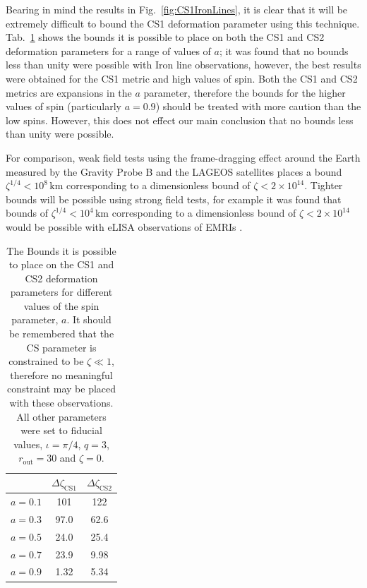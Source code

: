 Bearing in mind the results in Fig.\ \ref{fig:CS1IronLines}, it is clear that it will be extremely difficult to bound the CS1 deformation parameter using this technique. Tab.\ \ref{tab:CS1} shows the bounds it is possible to place on both the CS1 and CS2 deformation parameters for a range of values of $a$; it was found that no bounds less than unity were possible with Iron line observations, however, the best results were obtained for the CS1 metric and high values of spin. Both the CS1 and CS2 metrics are expansions in the $a$ parameter, therefore the bounds for the higher values of spin (particularly $a=0.9$) should be treated with more caution than the low spins. However, this does not effect our main conclusion that no bounds less than unity were possible. 

For comparison, weak field tests using the frame-dragging effect around the Earth measured by the Gravity Probe B and the LAGEOS satellites places a bound $\zeta^{1/4}<10^{8}\,\textrm{km}$ \citep{2011PhRvD..84l4033A} corresponding to a dimensionless bound of $\zeta < 2\times 10^{14}$. Tighter bounds will be possible using strong field tests, for example it was found that bounds of $\zeta^{1/4}<10^{4}\,\textrm{km}$ corresponding to a dimensionless bound of $\zeta < 2\times 10^{14}$ would be possible with eLISA observations of EMRIs \citep{2012PhRvD..86d4010C}.

\begin{table}[h]
\begin{center}
\begin{tabular}{ l | c  c }
	&$\Delta \zeta_{\textrm{CS1}}$ &$\Delta\zeta_{\textrm{CS2}}$\\
\hline
$a=0.1$ & 101  & 122	\\
$a=0.3$ & 97.0 & 62.6	\\
$a=0.5$ & 24.0 & 25.4	\\
$a=0.7$ & 23.9 & 9.98	\\
$a=0.9$ & 1.32 & 5.34	\\
\end{tabular}
\end{center}
\caption{The Bounds it is possible to place on the CS1 and CS2 deformation parameters for different values of the spin parameter, $a$. It should be remembered that the CS parameter is constrained to be $\zeta\ll 1$, therefore no meaningful constraint may be placed with these observations. All other parameters were set to fiducial values, $\iota=\pi/4$, $q=3$, $r_{\textrm{out}}=30$ and $\zeta=0$.}
\label{tab:CS1}
\end{table}

